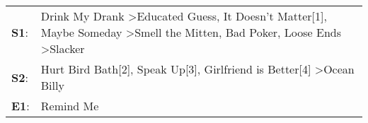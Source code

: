 \begin{supertabular}{p{0.03\textwidth}p{0.92\textwidth}}
 \textbf{S1}:  &  Drink My Drank\textsuperscript{} \textgreater \enspace Educated Guess\textsuperscript{}, \enspace It Doesn't Matter[1]\textsuperscript{}, \enspace Maybe Someday\textsuperscript{} \textgreater \enspace Smell the Mitten\textsuperscript{}, \enspace Bad Poker\textsuperscript{}, \enspace Loose Ends\textsuperscript{} \textgreater \enspace Slacker\textsuperscript{}  \enspace  \\
 \textbf{S2}:  &                                                                                                                                                                                       Hurt Bird Bath[2]\textsuperscript{}, \enspace Speak Up[3]\textsuperscript{}, \enspace Girlfriend is Better[4]\textsuperscript{} \textgreater \enspace Ocean Billy\textsuperscript{}  \enspace  \\
 \textbf{E1}:  &                                                                                                                                                                                                                                                                                                                                               Remind Me\textsuperscript{}  \enspace  \\
\end{supertabular}
